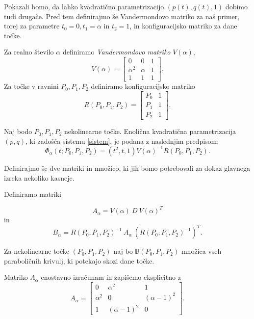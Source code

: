 \documentclass[mat1]{fmfdelo}
\newcommand{\B}{\mathbb B}
\newcommand{\al}{\alpha}
\begin{document}
Pokazali bomo, da lahko kvadratično parametrizacijo $(p(t), q(t),1)$ dobimo tudi drugače. Pred tem definirajmo še Vandermondovo matriko za naš primer, torej za parametre $t_0 = 0, t_1 = \al$ in $t_2 = 1$, in konfiguracijsko matriko za dane točke.

\begin{definicija}
Za realno število $\al$ definiramo \emph{Vandermondovo matriko} $V(\al)$,
$$V(\al) = 
\begin{bmatrix}
0 & 0 & 1 \\
\al ^2 & \al & 1 \\
1 & 1 & 1
\end{bmatrix}
.$$
Za točke v ravnini $P_0, P_1, P_2$ definiramo konfiguracijsko matriko
$$R(P_0, P_1, P_2) = 
\begin{bmatrix}
P_0 & 1 \\
P_1 & 1 \\
P_2 & 1
\end{bmatrix}
.$$
\end{definicija}


\begin{trditev}
Naj bodo $P_0, P_1, P_2$  nekolinearne točke. Enolična kvadratična parametrizacija $(p, q)$, ki zadošča sistemu \eqref{sistem}, je podana z naslednjim predpisom:
$$ \Phi_\al(t; P_0, P_1, P_2) = (t^2, t, 1) V(\al)^{-1} R(P_0, P_1, P_2).$$
\end{trditev}

Definirajmo še dve matriki in množico, ki jih bomo potrebovali za dokaz glavnega izreka nekoliko kasneje.

\begin{definicija}
Definiramo matriki

$$A_{\al} = V(\al) \ D \ V(\al)^T $$
in
$$B_{\al} =  R(P_0, P_1, P_2)^{-1}\  A_{\al} \  (R(P_0, P_1, P_2)^{-1})^T.$$

Za nekolinearne točke $(P_0, P_1, P_2)$ naj bo $\B(P_0, P_1, P_2)$ množica vseh paraboličnih krivulj, ki potekajo skozi dane točke.

\end{definicija}

\begin{opomba}
Matriko $A_\al$ enostavno izračunam in zapišemo eksplicitno z %
$$A_\al = 
\begin{bmatrix}
0 & \al^2 & 1 \\
\al^2 & 0 & (\al - 1)^2 \\
1 & (\al -1)^2 & 0
\end{bmatrix}
.$$

\end{opomba}
\end{document}
